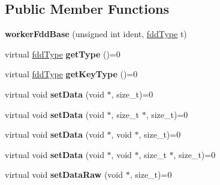 \subsection*{Public Member Functions}
\begin{DoxyCompactItemize}
\item 
\hypertarget{classfaster_1_1workerFddBase_a8e25e46286deed01d3131e2ac7fb7560}{}\label{classfaster_1_1workerFddBase_a8e25e46286deed01d3131e2ac7fb7560} 
{\bfseries worker\+Fdd\+Base} (unsigned int ident, \hyperlink{namespacefaster_aa8898687bc64536b60a3d5f365060cd6}{fdd\+Type} t)
\item 
\hypertarget{classfaster_1_1workerFddBase_a60a32cfcbe768ca3ffa64b98389441ee}{}\label{classfaster_1_1workerFddBase_a60a32cfcbe768ca3ffa64b98389441ee} 
virtual \hyperlink{namespacefaster_aa8898687bc64536b60a3d5f365060cd6}{fdd\+Type} {\bfseries get\+Type} ()=0
\item 
\hypertarget{classfaster_1_1workerFddBase_aece939bd2cd9652a7fb49d2dca865e3d}{}\label{classfaster_1_1workerFddBase_aece939bd2cd9652a7fb49d2dca865e3d} 
virtual \hyperlink{namespacefaster_aa8898687bc64536b60a3d5f365060cd6}{fdd\+Type} {\bfseries get\+Key\+Type} ()=0
\item 
\hypertarget{classfaster_1_1workerFddBase_a325bd99069264118804eb29ef808d37c}{}\label{classfaster_1_1workerFddBase_a325bd99069264118804eb29ef808d37c} 
virtual void {\bfseries set\+Data} (void $\ast$, size\+\_\+t)=0
\item 
\hypertarget{classfaster_1_1workerFddBase_a7301d03d82d61aae044b1e53d1595338}{}\label{classfaster_1_1workerFddBase_a7301d03d82d61aae044b1e53d1595338} 
virtual void {\bfseries set\+Data} (void $\ast$, size\+\_\+t $\ast$, size\+\_\+t)=0
\item 
\hypertarget{classfaster_1_1workerFddBase_ab3de9c6bb71c998d51482be316da4dce}{}\label{classfaster_1_1workerFddBase_ab3de9c6bb71c998d51482be316da4dce} 
virtual void {\bfseries set\+Data} (void $\ast$, void $\ast$, size\+\_\+t)=0
\item 
\hypertarget{classfaster_1_1workerFddBase_aa80255f187115a003f2e869366ecb6b6}{}\label{classfaster_1_1workerFddBase_aa80255f187115a003f2e869366ecb6b6} 
virtual void {\bfseries set\+Data} (void $\ast$, void $\ast$, size\+\_\+t $\ast$, size\+\_\+t)=0
\item 
\hypertarget{classfaster_1_1workerFddBase_ac02bc5670916dd922ea8d5c505b08899}{}\label{classfaster_1_1workerFddBase_ac02bc5670916dd922ea8d5c505b08899} 
virtual void {\bfseries set\+Data\+Raw} (void $\ast$, size\+\_\+t)=0
\item 

\end{DoxyCompactItemize}
